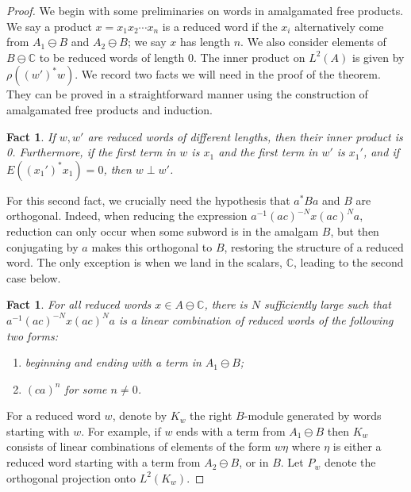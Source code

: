 \documentclass{amsart}
\newtheorem{fact}[theorem]{Fact}
\theoremstyle{definition}
\newcommand{\C}{\mathbb{C}}
\begin{document}
\begin{proof}
     We begin with some preliminaries on words in amalgamated free products. We say a product $x=x_1x_2\cdots x_n$ is a reduced word if the $x_i$ alternatively come from $A_1\ominus B$ and $A_2\ominus B$; we say $x$ has length $n$. We also consider elements of $B\ominus \C$ to be reduced words of length 0. The inner product on $L^2(A)$ is given by $\rho((w')^*w)$. We record two facts we will need in the proof of the theorem. They can be proved in a straightforward manner using the construction of amalgamated free products and induction. 

     \begin{fact}
         If $w,w'$ are reduced words of different lengths, then their inner product is 0. Furthermore, if the first term in $w$ is $x_1$ and the first term in $w'$ is $x_1'$, and if $E((x_1')^*x_1) = 0$, then $w\perp w'$. 
     \end{fact}

     For this second fact, we crucially need the hypothesis that $a^*Ba$ and $B$ are orthogonal. Indeed, when reducing the expression $a^{-1}(ac)^{-N}x(ac)^Na$, reduction can only occur when some subword is in the amalgam $B$, but then conjugating by $a$ makes this orthogonal to $B$, restoring the structure of a reduced word. The only exception is when we land in the scalars, $\C$, leading to the second case below.

     \begin{fact}\label{fact:possible-terms}
         For all reduced words $x \in A\ominus \C$, there is $N$ sufficiently large such that $a^{-1}(ac)^{-N}x(ac)^Na$ is a linear combination of reduced words of the following two forms:
         \begin{enumerate}
             \item beginning and ending with a term in $A_1\ominus B$;
            \item $(ca)^n$ for some $n\neq 0$.
         \end{enumerate}
     \end{fact}

     For a reduced word $w$, denote by $K_w$ the right $B$-module generated by words starting with $w$. For example, if $w$ ends with a term from $A_1\ominus B$ then $K_w$ consists of linear combinations of elements of the form $w\eta$ where $\eta$ is either a reduced word starting with a term from $A_2\ominus B$, or in $B$. Let $P_w$ denote the orthogonal projection onto $L^2(K_w)$.
     

\end{proof}
\end{document}
